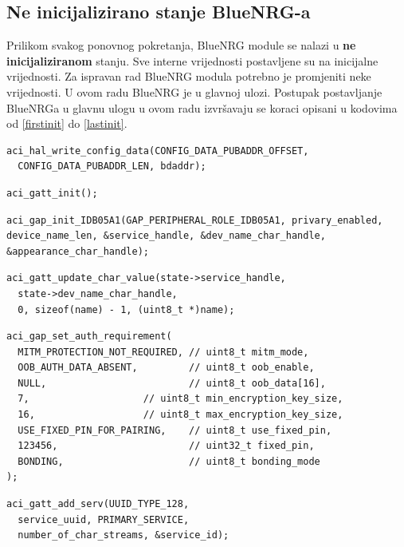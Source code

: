 \documentclass[times, utf8, diplomski]{diplomski}
\begin{document}
\subsection{Ne inicijalizirano stanje BlueNRG-a}
Prilikom svakog ponovnog pokretanja, BlueNRG module se nalazi u \textbf{ne inicijaliziranom} stanju. Sve interne vrijednosti postavljene su na inicijalne vrijednosti. Za ispravan rad BlueNRG modula potrebno je promjeniti neke vrijednosti. U ovom radu BlueNRG je u glavnoj ulozi. Postupak postavljanje BlueNRGa u glavnu ulogu u ovom radu izvršavaju se koraci opisani u kodovima od \ref{firstinit} do \ref{lastinit}.

\begin{lstlisting}[caption={Postavi MAC adresu}, label={firstinit}]
aci_hal_write_config_data(CONFIG_DATA_PUBADDR_OFFSET,
  CONFIG_DATA_PUBADDR_LEN, bdaddr);
\end{lstlisting}

\begin{lstlisting}[caption={Inicijaliziraj gatt podsustav}]
aci_gatt_init();
\end{lstlisting}

\begin{lstlisting}[caption={Inicijaliziraj gap podsustav}]
aci_gap_init_IDB05A1(GAP_PERIPHERAL_ROLE_IDB05A1, privary_enabled, device_name_len, &service_handle, &dev_name_char_handle, &appearance_char_handle);
\end{lstlisting}

\begin{lstlisting}[caption={Postavi ime kojim će se predstavljati ostalim bluetooth uređajima.}]
aci_gatt_update_char_value(state->service_handle,
  state->dev_name_char_handle,
  0, sizeof(name) - 1, (uint8_t *)name);
\end{lstlisting}

\begin{lstlisting}[caption={Postavi autentifikacijske zahtjeve}]
aci_gap_set_auth_requirement(
  MITM_PROTECTION_NOT_REQUIRED, // uint8_t mitm_mode,
  OOB_AUTH_DATA_ABSENT,         // uint8_t oob_enable,
  NULL,                         // uint8_t oob_data[16],
  7,                    // uint8_t min_encryption_key_size,
  16,                   // uint8_t max_encryption_key_size,
  USE_FIXED_PIN_FOR_PAIRING,    // uint8_t use_fixed_pin,
  123456,                       // uint32_t fixed_pin,
  BONDING,                      // uint8_t bonding_mode
);
\end{lstlisting}

\begin{lstlisting}[caption={Postavljanje sevisa koji sadrži karakteristične tokve}]
aci_gatt_add_serv(UUID_TYPE_128,
  service_uuid, PRIMARY_SERVICE,
  number_of_char_streams, &service_id);
\end{lstlisting}
\end{document}
